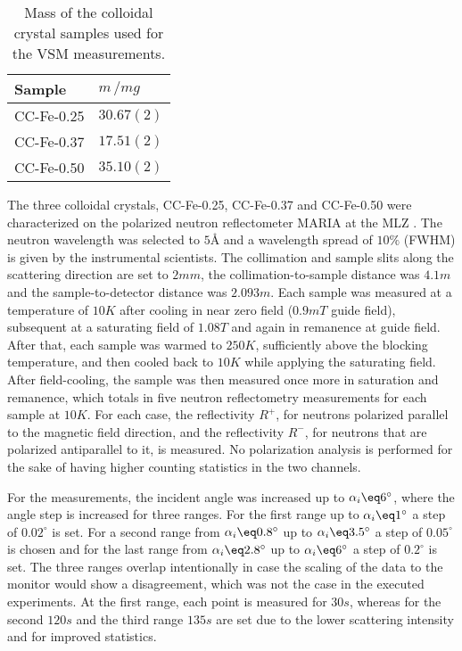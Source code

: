 \documentclass[\main/dresen_thesis.tex]{subfiles}
\begin{document}
    \begin{table}[htbp]
      \centering
      \caption{\label{tab:colloidalCrystals:layerCharacterization:ppmsMasses}Mass of the colloidal crystal samples used for the VSM measurements.}
      \begin{tabular}{ l | l}
        \rule{0pt}{2ex} \textbf{Sample}  & $m \, / \unit{mg}$ \\
        \hline
        \rule{0pt}{2ex} CC-Fe-0.25   & $30.67(2)$ \\
        \rule{0pt}{2ex} CC-Fe-0.37   & $17.51(2)$ \\
        \rule{0pt}{2ex} CC-Fe-0.50   & $35.10(2)$ \\
        \hline
      \end{tabular}
    \end{table}

    The three colloidal crystals, CC-Fe-0.25, CC-Fe-0.37 and CC-Fe-0.50 were characterized on the polarized neutron reflectometer MARIA at the MLZ .
    The neutron wavelength was selected to $5 \unit{\angstrom}$ and a wavelength spread of $10 \unit{\%}$ (FWHM) is given by the instrumental scientists.
    The collimation and sample slits along the scattering direction are set to $2 \unit{mm}$, the collimation-to-sample distance was $4.1 \unit{m}$ and the sample-to-detector distance was $2.093 \unit{m}$.
    Each sample was measured at a temperature of $10 \unit{K}$ after cooling in near zero field ($0.9 \unit{mT}$ guide field), subsequent at a saturating field of $1.08 \unit{T}$ and again in remanence at guide field.
    After that, each sample was warmed to $250 \unit{K}$, sufficiently above the blocking temperature, and then cooled back to $10 \unit{K}$ while applying the saturating field.
    After field-cooling, the sample was then measured once more in saturation and remanence, which totals in five neutron reflectometry measurements for each sample at $10 \unit{K}$.
    For each case, the reflectivity $R^{+}$, for neutrons polarized parallel to the magnetic field direction, and the reflectivity $R^{-}$, for neutrons that are polarized antiparallel to it, is measured.
    No polarization analysis is performed for the sake of having higher counting statistics in the two channels.

    For the measurements, the incident angle was increased up to $\alpha_i \eq 6 ^\circ$, where the angle step is increased for three ranges.
    For the first range up to $\alpha_i \eq 1 ^\circ$ a step of $0.02 ^\circ$ is set.
    For a second range from $\alpha_i \eq 0.8 ^\circ$ up to $\alpha_i \eq 3.5 ^\circ$ a step of $0.05 ^\circ$ is chosen and for the last range from $\alpha_i \eq 2.8 ^\circ$ up to $\alpha_i \eq 6 ^\circ$ a step of $0.2 ^\circ$ is set.
    The three ranges overlap intentionally in case the scaling of the data to the monitor would show a disagreement, which was not the case in the executed experiments.
    At the first range, each point is measured for $30 \unit{s}$, whereas for the second $120 \unit{s}$ and the third range $135 \unit{s}$ are set due to the lower scattering intensity and for improved statistics.
\end{document}

